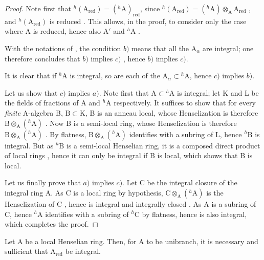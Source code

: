 \begin{proof}
Note first that ${}^h(\mathrm{A}_{\mathrm{red}})=({}^h\!\mathrm{A})_{\mathrm{red}}$, since ${}^h(\mathrm{A}_{\mathrm{red}})=({}^h\!\mathrm{A})\otimes_{\mathrm{A}}\mathrm{A}_{\mathrm{red}}$ , and ${}^h(\mathrm{A}_{\mathrm{red}})$ is reduced .
This allows, in the proof, to consider only the case where A is reduced, hence also $\mathrm{A}'$  and ${}^h\!\mathrm{A}$ .

With the notations of , the condition $b)$ means that all the $\mathrm{A}_\alpha$ are integral;
one therefore concludes that $b)$ implies $c)$ , hence $b)$ implies $c)$.

It is clear that if ${}^h\!\mathrm{A}$ is integral, so are each of the $\mathrm{A}_\alpha\subset{}^h\!\mathrm{A}$, hence $c)$ implies $b)$.

Let us show that $c)$ implies $a)$.
Note first that $\mathrm{A}\subset{}^h\!\mathrm{A}$ is integral;
let K and L be the fields of fractions of A and ${}^h\!\mathrm{A}$ respectively.
It suffices to show that for every \emph{finite} A-algebra B, $\mathrm{B}\subset\mathrm{K}$, B is an anneau local, whose Henselization is therefore $\mathrm{B}\otimes_{\mathrm{A}}({}^h\!\mathrm{A})$ .
Now B is a semi-local ring, whose Henselization is therefore $\mathrm{B}\otimes_{\mathrm{A}}({}^h\!\mathrm{A})$ .
By flatness, $\mathrm{B}\otimes_{\mathrm{A}}({}^h\!\mathrm{A})$ identifies with a subring of L, hence ${}^h\!\mathrm{B}$ is integral.
But as ${}^h\!\mathrm{B}$ is a semi-local Henselian ring, it is a composed direct product of local rings , hence it can only be integral if B is local, which shows that B is local.

Let us finally prove that $a)$ implies $c)$.
Let C be the integral closure of the integral ring A.
As C is a local ring by hypothesis, $\mathrm{C}\otimes_{\mathrm{A}}({}^h\!\mathrm{A})$ is the Henselization of C , hence is integral and integrally closed .
As A is a subring of C, hence ${}^h\!\mathrm{A}$ identifies with a subring of ${}^h\!\mathrm{C}$ by flatness, hence is also integral, which completes the proof.
\end{proof}

\begin{corollary}[18.6.13]
\label{IV.18.6.13}
Let $\mathrm{A}$ be a local Henselian ring.
Then, for A to be unibranch, it is necessary and sufficient that $\mathrm{A}_{\mathrm{red}}$ be integral.
\end{corollary}

